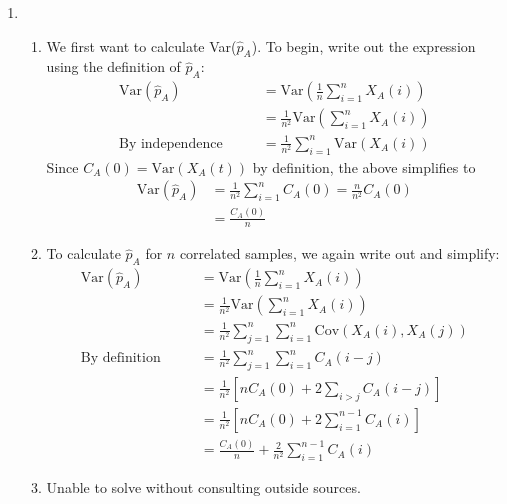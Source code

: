 \documentclass[12pt]{article}
\theoremstyle{plain}
\theoremstyle{definition}
\theoremstyle{remark}
\begin{document}
\begin{enumerate}
  \item %
    \begin{enumerate}
      \item %
        We first want to calculate Var($\hat{p}_A$). To begin, write out
        the expression using the definition of $\hat{p}_A$:
        \begin{align*}
          \text{Var}(\hat{p}_A)
          &=\text{Var}\left( \frac{1}{n} \sum^n_{i=1} X_A(i)\right) \\
          &= \frac{1}{n^2} \text{Var}\left( \sum^n_{i=1} X_A(i)\right) \\
          \text{By independence} \qquad
          &= \frac{1}{n^2} \sum^n_{i=1}  \text{Var}\left(X_A(i)\right)
        \end{align*}
        Since $C_A(0) = \text{Var}(X_A(t))$ by definition, the above
        simplifies to
        \begin{align*}
          \text{Var}(\hat{p}_A)
          &= \frac{1}{n^2} \sum^n_{i=1}  C_A(0)
          = \frac{n}{n^2} C_A(0)\\
          &= \frac{C_A(0)}{n}
        \end{align*}

      \item %
        To calculate $\hat{p}_A$ for $n$ correlated samples, we again
        write out and simplify:
        \begin{align*}
          \text{Var}(\hat{p}_A)
          &=\text{Var}\left( \frac{1}{n} \sum^n_{i=1} X_A(i)\right) \\
          &= \frac{1}{n^2} \text{Var}\left( \sum^n_{i=1} X_A(i)\right) \\
          &= \frac{1}{n^2} \sum^n_{j=1}\sum^n_{i=1}
            \text{Cov}\left(X_A(i), X_A(j)\right)\\
          \text{By definition} \qquad
            &= \frac{1}{n^2} \sum^n_{j=1}\sum^n_{i=1} C_A(i-j) \\
          &= \frac{1}{n^2}
            \left[ n C_A(0) + 2 \sum_{i>j} C_A(i-j) \right] \\
          &= \frac{1}{n^2}
            \left[ n C_A(0) + 2 \sum^{n-1}_{i=1} C_A(i) \right] \\
          &= \frac{C_A(0)}{n}
            + \frac{2}{n^2} \sum^{n-1}_{i=1} C_A(i)
        \end{align*}

      \item Unable to solve without consulting outside sources.
    \end{enumerate}


\end{enumerate}
\end{document}
